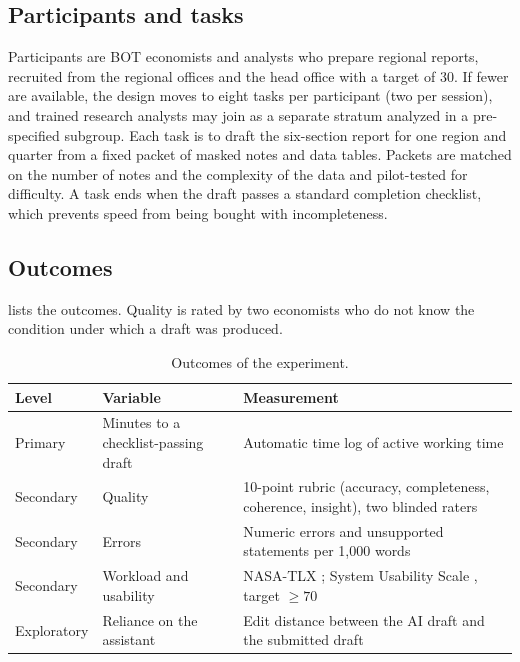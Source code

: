 \documentclass[11pt]{article}
\begin{document}
\subsection{Participants and tasks}
Participants are BOT economists and analysts who prepare regional reports, recruited from the regional offices and the head office with a target of 30. If fewer are available, the design moves to eight tasks per participant (two per session), and trained research analysts may join as a separate stratum analyzed in a pre-specified subgroup. Each task is to draft the six-section report for one region and quarter from a fixed packet of masked notes and data tables. Packets are matched on the number of notes and the complexity of the data and pilot-tested for difficulty. A task ends when the draft passes a standard completion checklist, which prevents speed from being bought with incompleteness.

\subsection{Outcomes}
 lists the outcomes. Quality is rated by two economists who do not know the condition under which a draft was produced.

\begin{table}[tbp]
\centering\small
\caption{Outcomes of the experiment.}\label{tab:outcomes}
\begin{tabularx}{\textwidth}{@{}L{2.0cm}L{4.4cm}Y@{}}
\toprule
Level & Variable & Measurement \\
\midrule
Primary & Minutes to a checklist-passing draft & Automatic time log of active working time \\
Secondary & Quality & 10-point rubric (accuracy, completeness, coherence, insight), two blinded raters \\
Secondary & Errors & Numeric errors and unsupported statements per 1{,}000 words \\
Secondary & Workload and usability & NASA-TLX \citep{hart1988nasatlx}; System Usability Scale \citep{brooke1996sus}, target $\geq 70$ \\
Exploratory & Reliance on the assistant & Edit distance between the AI draft and the submitted draft \\
\bottomrule
\end{tabularx}
\end{table}
\end{document}
